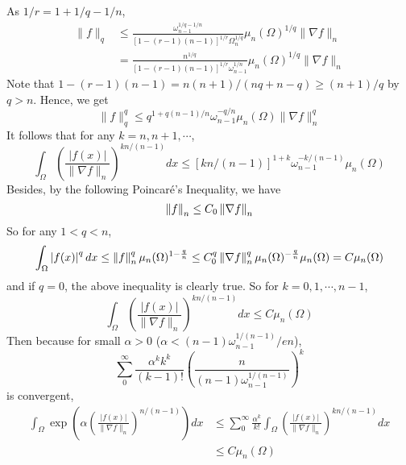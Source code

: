 \begin{enumerate}[label=\Roman*.]
\begin{equation*}
	\end{equation*}
	As $1 / r = 1 + 1/q - 1/n$,
	\begin{equation*}
		\begin{aligned}
			\|f\|_q & \leq \frac{\omega_{n-1}^{1 / q-1 / n}}{[1-(r-1)(n-1)]^{1 / r} \Omega_n^{1 / q}} \mu_n(\Omega)^{1 / q}\|\nabla f\|_n \\
			& =\frac{n^{1 / q}}{[1-(r-1)(n-1)]^{1 / r} \omega_{n-1}^{1 / n}} \mu_n(\Omega)^{1 / q}\|\nabla f\|_n
		\end{aligned}
	\end{equation*}
	Note that $1-(r-1)(n-1)=n(n+1) /(n q+n-q) \geq(n+1) / q$ by $q > n$. Hence, we get
	\begin{equation*}
		\|f\|_q^q \leq q^{1+q(n-1) / n} \omega_{n-1}^{-q / n} \mu_n(\Omega)\|\nabla f\|_n^q
	\end{equation*}
	It follows that for any $k = n,n+1,\cdots$,
	\begin{equation*}
		\int_{\Omega}\left(\frac{|f(x)|}{\|\nabla f\|_n}\right)^{k n /(n-1)} d x \leq[k n /(n-1)]^{1+k} \omega_{n-1}^{-k /(n-1)} \mu_n(\Omega)
	\end{equation*}
	Besides, by the following Poincar\'e's Inequality, we have
	\begin{equation*}
		\left\lVert f\right\lVert_n \leq C_0\left\lVert\nabla f\right\lVert_n
	\end{equation*}
	So for any $1< q < n$,
	\begin{equation*}
		\int_{\Omega} \left\lvert f(x)\right\lvert^q dx \leq \left\lVert f\right\lVert_n^q\mu_n(\Omega)^{1-\frac{q}{n}} \leq C_0^q\left\lVert\nabla f\right\lVert_n^q\mu_n(\Omega)^{-\frac{q}{n}}\mu_n(\Omega) = C\mu_n(\Omega)
	\end{equation*}
	and if $q = 0$, the above inequality is clearly true. So for $k = 0, 1, \cdots,n-1$,
	\begin{equation*}
		\int_{\Omega}\left(\frac{|f(x)|}{\|\nabla f\|_n}\right)^{k n /(n-1)} d x \leq C\mu_n(\Omega)
	\end{equation*}
	Then because for small $\alpha>0$ ($\alpha<(n-1) \omega_{n-1}^{1 /(n-1)} / e n$),
	\begin{equation*}
		\sum_0^{\infty} \frac{\alpha^k k^k}{(k-1)!}\left(\frac{n}{(n-1) \omega_{n-1}^{1 /(n-1)}}\right)^k
	\end{equation*}
	is convergent,
	\begin{equation*}
		\begin{aligned}
			\int_{\Omega} \exp \left(\alpha\left(\frac{|f(x)|}{\|\nabla f\|_n}\right)^{n /(n-1)}\right) d x & \leq \sum_0^{\infty} \frac{\alpha^k}{k!} \int_{\Omega}\left(\frac{|f(x)|}{\|\nabla f\|_n}\right)^{k n /(n-1)} d x \\
			& \leq C \mu_n(\Omega)
		\end{aligned}
	\end{equation*}
\end{enumerate}

